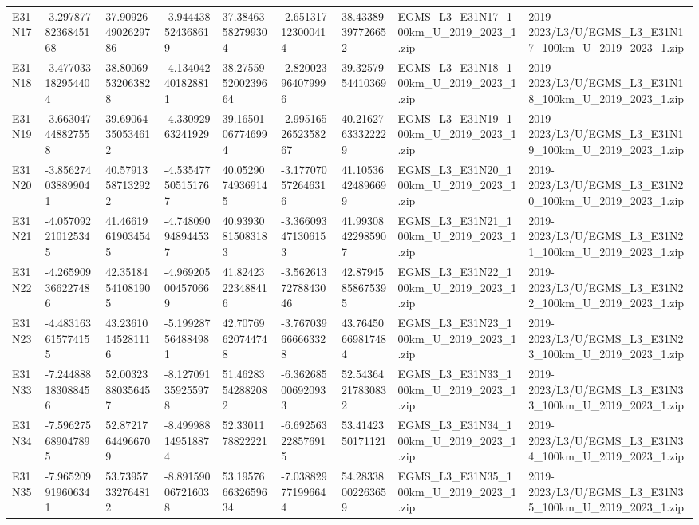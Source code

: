 \begin{landscape}
\begin{longtable}{lllllllll}
E31N17 & -3.2978778236845168 & 37.909264902629786 & -3.944438524368619 & 37.38463582799304 & -2.651317123000414 & 38.43389397726652 & EGMS\_L3\_E31N17\_100km\_U\_2019\_2023\_1.zip & 2019-2023/L3/U/EGMS\_L3\_E31N17\_100km\_U\_2019\_2023\_1.zip \\
E31N18 & -3.477033182954404 & 38.80069532063828 & -4.134042401828811 & 38.275595200239664 & -2.820023964079996 & 39.3257954410369 & EGMS\_L3\_E31N18\_100km\_U\_2019\_2023\_1.zip & 2019-2023/L3/U/EGMS\_L3\_E31N18\_100km\_U\_2019\_2023\_1.zip \\
E31N19 & -3.663047448827558 & 39.69064350534612 & -4.33092963241929 & 39.16501067746994 & -2.9951652652358267 & 40.21627633322229 & EGMS\_L3\_E31N19\_100km\_U\_2019\_2023\_1.zip & 2019-2023/L3/U/EGMS\_L3\_E31N19\_100km\_U\_2019\_2023\_1.zip \\
E31N20 & -3.856274038899041 & 40.57913587132922 & -4.535477505151767 & 40.05290749369145 & -3.177070572646316 & 41.10536424896699 & EGMS\_L3\_E31N20\_100km\_U\_2019\_2023\_1.zip & 2019-2023/L3/U/EGMS\_L3\_E31N20\_100km\_U\_2019\_2023\_1.zip \\
E31N21 & -4.057092210125345 & 41.46619619034545 & -4.748090948944537 & 40.93930815083183 & -3.366093471306153 & 41.99308422985907 & EGMS\_L3\_E31N21\_100km\_U\_2019\_2023\_1.zip & 2019-2023/L3/U/EGMS\_L3\_E31N21\_100km\_U\_2019\_2023\_1.zip \\
E31N22 & -4.265909366227486 & 42.35184541081905 & -4.969205004570669 & 41.82423223488416 & -3.5626137278843046 & 42.87945858675395 & EGMS\_L3\_E31N22\_100km\_U\_2019\_2023\_1.zip & 2019-2023/L3/U/EGMS\_L3\_E31N22\_100km\_U\_2019\_2023\_1.zip \\
E31N23 & -4.483163615774155 & 43.23610145281116 & -5.199287564884981 & 42.70769620744748 & -3.767039666663328 & 43.76450669817484 & EGMS\_L3\_E31N23\_100km\_U\_2019\_2023\_1.zip & 2019-2023/L3/U/EGMS\_L3\_E31N23\_100km\_U\_2019\_2023\_1.zip \\
E31N33 & -7.244888183088456 & 52.00323880356457 & -8.127091359255978 & 51.46283542882082 & -6.362685006920933 & 52.54364217830832 & EGMS\_L3\_E31N33\_100km\_U\_2019\_2023\_1.zip & 2019-2023/L3/U/EGMS\_L3\_E31N33\_100km\_U\_2019\_2023\_1.zip \\
E31N34 & -7.596275689047895 & 52.87217644966709 & -8.499988149518874 & 52.3301178822221 & -6.692563228576915 & 53.4142350171121 & EGMS\_L3\_E31N34\_100km\_U\_2019\_2023\_1.zip & 2019-2023/L3/U/EGMS\_L3\_E31N34\_100km\_U\_2019\_2023\_1.zip \\
E31N35 & -7.965209919606341 & 53.73957332764812 & -8.891590067216038 & 53.195766632659634 & -7.038829771996644 & 54.28338002263659 & EGMS\_L3\_E31N35\_100km\_U\_2019\_2023\_1.zip & 2019-2023/L3/U/EGMS\_L3\_E31N35\_100km\_U\_2019\_2023\_1.zip \\

\end{longtable}
\end{landscape}
